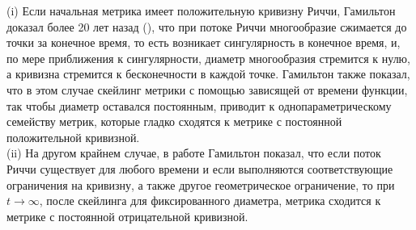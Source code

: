 (i) Если начальная метрика имеет положительную кривизну Риччи, 
Гамильтон доказал более 20 лет назад (\cite{c29}), что при потоке Риччи 
многообразие сжимается до точки за конечное время, то есть возникает 
сингулярность в конечное время, и, по мере приближения к сингулярности, 
диаметр многообразия стремится к нулю, а кривизна стремится к 
бесконечности в каждой точке. Гамильтон также показал, что в этом 
случае скейлинг метрики с помощью зависящей от времени функции, 
так чтобы диаметр оставался постоянным, приводит к однопараметрическому 
семейству метрик, которые гладко сходятся к метрике с постоянной 
положительной кривизной.\\
(ii) На другом крайнем случае, в работе \cite{c36} Гамильтон показал, что если 
поток Риччи существует для любого времени и если выполняются 
соответствующие ограничения на кривизну, а также другое геометрическое 
ограничение, то при $t \rightarrow \infty$, после скейлинга для фиксированного 
диаметра, метрика сходится к метрике с постоянной отрицательной кривизной.

